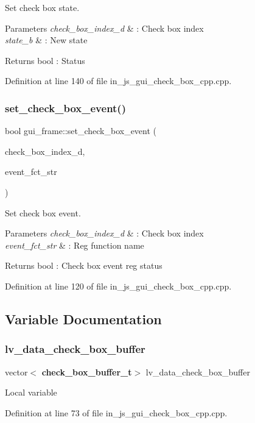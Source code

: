 Set check box state. 


\begin{DoxyParams}{Parameters}
{\em check\+\_\+box\+\_\+index\+\_\+d} & \+: Check box index \\
\hline
{\em state\+\_\+b} & \+: New state \\
\hline
\end{DoxyParams}
\begin{DoxyReturn}{Returns}
bool \+: Status 
\end{DoxyReturn}


Definition at line 140 of file in\+\_\+js\+\_\+gui\+\_\+check\+\_\+box\+\_\+cpp.\+cpp.

\mbox{\label{group___check__box_gab841ed90c99d1be369001c227090aebf}} 
\subsubsection{set\_check\_box\_event()}
{\footnotesize\ttfamily bool gui\+\_\+frame\+::set\+\_\+check\+\_\+box\+\_\+event (\begin{DoxyParamCaption}\item[{double}]{check\+\_\+box\+\_\+index\+\_\+d,  }\item[{wx\+String}]{event\+\_\+fct\+\_\+str }\end{DoxyParamCaption})}



Set check box event. 


\begin{DoxyParams}{Parameters}
{\em check\+\_\+box\+\_\+index\+\_\+d} & \+: Check box index \\
\hline
{\em event\+\_\+fct\+\_\+str} & \+: Reg function name \\
\hline
\end{DoxyParams}
\begin{DoxyReturn}{Returns}
bool \+: Check box event reg status 
\end{DoxyReturn}


Definition at line 120 of file in\+\_\+js\+\_\+gui\+\_\+check\+\_\+box\+\_\+cpp.\+cpp.



\subsection{Variable Documentation}
\mbox{\label{group___check__box_gafd5502a3268148ed92bef51643dc7b8d}} 
\subsubsection{lv\_data\_check\_box\_buffer}
{\footnotesize\ttfamily vector$<$\textbf{ check\+\_\+box\+\_\+buffer\+\_\+t}$>$ lv\+\_\+data\+\_\+check\+\_\+box\+\_\+buffer}

Local variable 

Definition at line 73 of file in\+\_\+js\+\_\+gui\+\_\+check\+\_\+box\+\_\+cpp.\+cpp.

